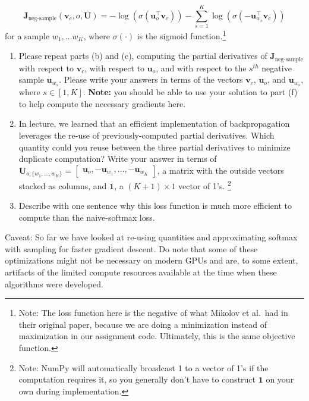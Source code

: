 \documentclass{article}
\begin{document}
\begin{enumerate}[label=(\alph*)]
\begin{equation}
\bm J_{\text{neg-sample}}(\bm v_c, o, \bm U) = -\log(\sigma(\bm u_o^\top \bm v_c)) - \sum_{s=1}^K \log(\sigma(-\bm u_{w_s}^\top \bm v_c))
\end{equation}
for a sample $w_1, \ldots w_K$, where $\sigma(\cdot)$ is the sigmoid function.\footnote{Note: The loss function here is the negative of what Mikolov et al.\ had in their original paper, because we are doing a minimization instead of maximization in our assignment code. Ultimately, this is the same objective function.}

\begin{enumerate}[label=(\roman*)]
\item Please repeat parts (b) and (c), computing the partial derivatives of $\bm J_{\text{neg-sample}}$ with respect to $\bm v_c$, with respect to $\bm u_o$, and with respect to the $s^{th}$ negative sample $\bm u_{w_s}$. Please write your answers in terms of the vectors $\bm v_c$, $\bm u_o$, and $\bm u_{w_s}$, where $s \in [1, K]$. \textbf{Note:} you should be able to use your solution to part (f) to help compute the necessary gradients here.

\item In lecture, we learned that an efficient implementation of backpropagation leverages the re-use of previously-computed partial derivatives. Which quantity could you reuse between the three partial derivatives to minimize duplicate computation? Write your answer in terms of \\ $\bm{U}_{o, \{w_1, \dots, w_K\}} = \begin{bmatrix} \bm{u}_o, -\bm{u}_{w_1}, \dots, -\bm{u}_{w_K} \end{bmatrix}$, a matrix with the outside vectors stacked as columns, and $\bm{1}$, a $(K + 1) \times 1$ vector of 1's. \footnote{Note: NumPy will automatically broadcast 1 to a vector of 1's if the computation requires it, so you generally don't have to construct $\bm{1}$ on your own during implementation.}

\item Describe with one sentence why this loss function is much more efficient to compute than the naive-softmax loss.
\end{enumerate}

Caveat: So far we have looked at re-using quantities and approximating softmax with sampling for faster gradient descent. Do note that some of these optimizations might not be necessary on modern GPUs and are, to some extent, artifacts of the limited compute resources available at the time when these algorithms were developed.


\end{enumerate}
\end{document}
